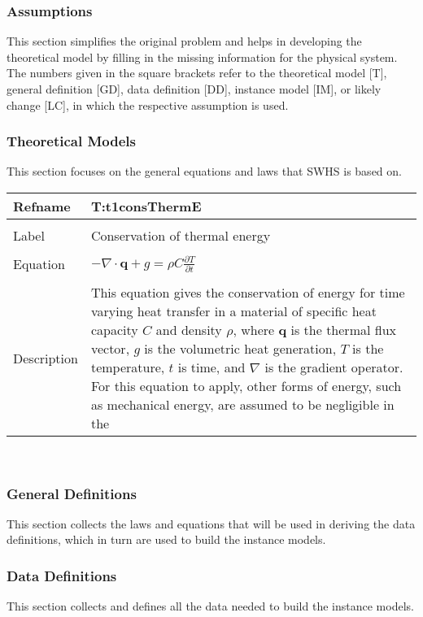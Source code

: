 \documentclass[12pt]{article}
\begin{document}
\subsubsection{Assumptions}
\label{Sec:Assu}
This section simplifies the original problem and helps in developing the theoretical model by filling in the missing information for the physical system. The numbers given in the square brackets refer to the theoretical model [T], general definition [GD], data definition [DD], instance model [IM], or likely change [LC], in which the respective assumption is used.
\subsubsection{Theoretical Models}
\label{Sec:TheoMode}
This section focuses on the general equations and laws that SWHS is based on.
~\newline
\noindent \begin{minipage}{\textwidth}
\begin{tabular}{p{} p{}}
\toprule \textbf{Refname} & \textbf{T:t1consThermE}
\label{T:t1consThermE}
\\ \midrule \\
Label & Conservation of thermal energy
\\ \midrule \\
Equation & $-\nabla{}\cdot{}\mathbf{q}+g=\rho{}C\frac{\partial{}T}{\partial{}t}$
\\ \midrule \\
Description & This equation gives the conservation of energy for time varying heat transfer in a material of specific heat capacity $C$ and density $\rho{}$, where $\mathbf{q}$ is the thermal flux vector, $g$ is the volumetric heat generation, $T$ is the temperature, $t$ is time, and $\nabla{}$ is the gradient operator. For this equation to apply, other forms of energy, such as mechanical energy, are assumed to be negligible in the
\\ \bottomrule \end{tabular}
\end{minipage}\\
\subsubsection{General Definitions}
\label{Sec:GeneDefi}
This section collects the laws and equations that will be used in deriving the data definitions, which in turn are used to build the instance models.
\subsubsection{Data Definitions}
\label{Sec:DataDefi}
This section collects and defines all the data needed to build the instance models.
\end{document}
